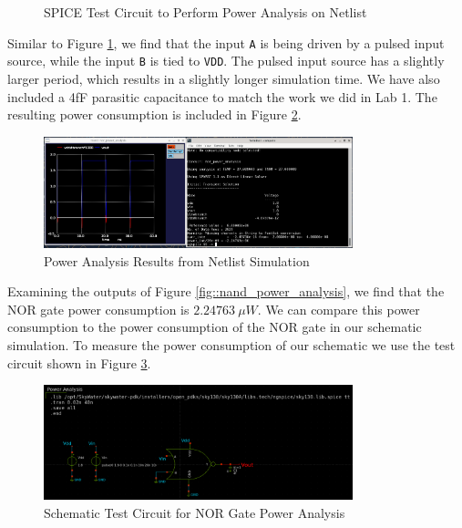 \documentclass{article}
\begin{document}
	\begin{figure}[H]
		
		\caption{SPICE Test Circuit to Perform Power Analysis on Netlist}
		\label{fig::nor_power_analysis_test_circuit}
	\end{figure}
	
	\noindent Similar to Figure \ref{fig::nor_power_analysis_test_circuit}, we find that the input \texttt{A} is being driven by a pulsed input source, while the input \texttt{B} is tied to \texttt{VDD}. The pulsed input source has a slightly larger period, which results in a slightly longer simulation time. We have also included a 4fF parasitic capacitance to match the work we did in Lab 1. The resulting power consumption is included in Figure \ref{fig::nor_power_analysis}.
	
	\begin{figure}[H]
		\centerline{\includegraphics[width=0.8\textwidth]{nor_power_analysis.png}}
		\caption{Power Analysis Results from Netlist Simulation}
		\label{fig::nor_power_analysis}
	\end{figure}
	
	\noindent Examining the outputs of Figure \ref{fig::nand_power_analysis}, we find that the NOR gate power consumption is $2.24763\ \mu{W}$. We can compare this power consumption to the power consumption of the NOR gate in our schematic simulation. To measure the power consumption of our schematic we use the test circuit shown in Figure \ref{fig::nor_power_analysis_test_circuit_schem}.
	
	\begin{figure}[H]
		\centerline{\includegraphics[width=0.8\textwidth]{nor_power_analysis_test_circuit.png}}
		\caption{Schematic Test Circuit for NOR Gate Power Analysis}
		\label{fig::nor_power_analysis_test_circuit_schem}
	\end{figure}
	
\end{document}
